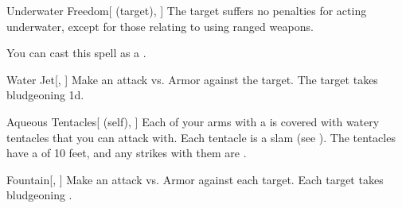 \lowercase{\hypertarget{spell:Underwater Freedom}{}}\label{spell:Underwater Freedom}
\begin{attuneability}[\nth{1}]{\hypertarget{spell:Underwater Freedom}{Underwater Freedom}}[ (target), ]
The target suffers no penalties for acting underwater, except for those relating to using ranged weapons.

You can cast this spell as a .
\end{attuneability}
\vspace{0.25em}



\lowercase{\hypertarget{spell:Water Jet}{}}\label{spell:Water Jet}
\begin{freeability}[\nth{1}]{\hypertarget{spell:Water Jet}{Water Jet}}[, ]
Make an attack vs. Armor against the target.
\hit The target takes bludgeoning  \plus1d.
\end{freeability}
\vspace{0.25em}



\lowercase{\hypertarget{spell:Aqueous Tentacles}{}}\label{spell:Aqueous Tentacles}
\begin{attuneability}[\nth{2}]{\hypertarget{spell:Aqueous Tentacles}{Aqueous Tentacles}}[ (self), ]
Each of your arms with a  is covered with watery tentacles that you can attack with.
Each tentacle is a slam  (see ).
The tentacles have a  of 10 feet, and any strikes with them are .
\end{attuneability}
\vspace{0.25em}



\lowercase{\hypertarget{spell:Fountain}{}}\label{spell:Fountain}
\begin{freeability}[\nth{2}]{\hypertarget{spell:Fountain}{Fountain}}[, ]
Make an attack vs. Armor against each target.
\hit Each target takes bludgeoning .
\end{freeability}
\vspace{0.25em}



